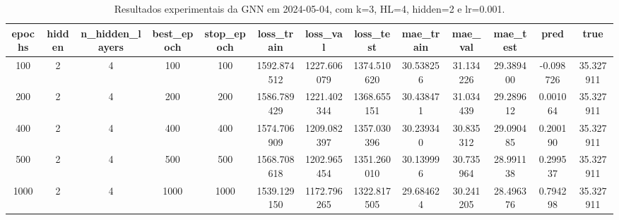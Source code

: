 \begin{table}[h]
\centering
\caption{Resultados experimentais da GNN em 2024-05-04, com k=3, HL=4, hidden=2 e lr=0.001.}
\label{tab:gnn_results_k3_hl4_h2_d20240504}
\begin{tabular}{ccccccccccccc}
\toprule
epochs & hidden & n\_hidden\_layers & best\_epoch & stop\_epoch & loss\_train & loss\_val & loss\_test & mae\_train & mae\_val & mae\_test & pred & true \\
\midrule
100 & 2 & 4 & 100 & 100 & 1592.874512 & 1227.606079 & 1374.510620 & 30.538256 & 31.134226 & 29.389400 & -0.098726 & 35.327911 \\
200 & 2 & 4 & 200 & 200 & 1586.789429 & 1221.402344 & 1368.655151 & 30.438471 & 31.034439 & 29.289612 & 0.001064 & 35.327911 \\
400 & 2 & 4 & 400 & 400 & 1574.706909 & 1209.082397 & 1357.030396 & 30.239340 & 30.835312 & 29.090485 & 0.200190 & 35.327911 \\
500 & 2 & 4 & 500 & 500 & 1568.708618 & 1202.965454 & 1351.260010 & 30.139996 & 30.735964 & 28.991138 & 0.299537 & 35.327911 \\
1000 & 2 & 4 & 1000 & 1000 & 1539.129150 & 1172.796265 & 1322.817505 & 29.684624 & 30.241205 & 28.496376 & 0.794298 & 35.327911 \\
\bottomrule
\end{tabular}
\end{table}
